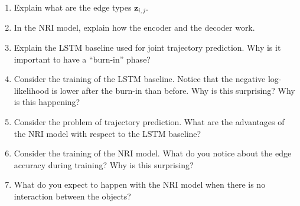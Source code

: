 \documentclass[11pt]{article}
\begin{document}
\begin{questionbox}
\begin{enumerate}[leftmargin=*]
	\item Explain what are the edge types $\mathbf{z}_{i,j}$.

	\item In the NRI model, explain how the encoder and the decoder work.

	\item Explain the LSTM baseline used for joint trajectory prediction.
	      Why is it important to have a ``burn-in'' phase?

	\item Consider the training of the LSTM baseline. Notice that the negative log-likelihood
	      is lower after the burn-in than before. Why is this surprising? Why is this happening?

	\item Consider the problem of trajectory prediction. What are the advantages of the NRI model
	      with respect to the LSTM baseline?

	\item Consider the training of the NRI model. What do you notice about the edge accuracy
	      during training? Why is this surprising?

	\item What do you expect to happen with the NRI model when there is no interaction
	      between the objects?
\end{enumerate}
\end{questionbox}
\end{document}
